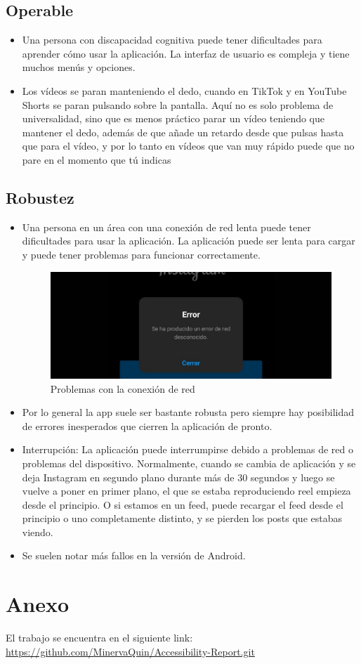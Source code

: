 \documentclass{article}
\begin{document}
\subsection{Operable}

\begin{itemize}    
    \item Una persona con discapacidad cognitiva puede tener dificultades para aprender cómo usar la aplicación. La interfaz de usuario es compleja y tiene muchos menús y opciones.
    \item Los vídeos se paran manteniendo el dedo, cuando en TikTok y en YouTube Shorts se paran pulsando sobre la pantalla. Aquí no es solo problema de universalidad, sino que es menos práctico parar un vídeo teniendo que mantener el dedo, además de que añade un retardo desde que pulsas hasta que para el vídeo, y por lo tanto en vídeos que van muy rápido puede que no pare en el momento que tú indicas
\end{itemize}

\subsection{Robustez}
\begin{itemize}
    \item Una persona en un área con una conexión de red lenta puede tener dificultades para usar la aplicación. La aplicación puede ser lenta para cargar y puede tener problemas para funcionar correctamente.
    \begin{figure}[!h]
        \centering
        \includegraphics[width=0.30\linewidth]{img21.jpeg}
        \caption{Problemas con la conexión de red}
    \end{figure}
    \item Por lo general la app suele ser bastante robusta pero siempre hay posibilidad de errores inesperados que cierren la aplicación de pronto.
    \item Interrupción: La aplicación puede interrumpirse debido a problemas de red o problemas del dispositivo. Normalmente, cuando se cambia de aplicación y se deja Instagram en segundo plano durante más de 30 segundos y luego se vuelve a poner en primer plano, el que se estaba reproduciendo reel empieza desde el principio. O si estamos en un feed, puede recargar el feed desde el principio o uno completamente distinto, y se pierden los posts que estabas viendo.
    \item Se suelen notar más fallos en la versión de Android.
    
\end{itemize}

\section{Anexo}
El trabajo se encuentra en el siguiente link: \href{https://github.com/MinervaQuin/Accessibility-Report.git}{https://github.com/MinervaQuin/Accessibility-Report.git}
\end{document}
